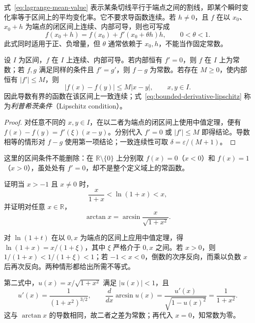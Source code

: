 \documentclass[UTF8,12pt,a4paper,fontset=fandol]{ctexbook}
\begin{document}
式~\eqref{eq:lagrange-mean-value} 表示某条切线平行于端点之间的割线，即某个瞬时变化率等于区间上的平均变化率。它不要求导函数连续。若 $h\neq0$，且 $f$ 在以 $x_0$、$x_0+h$ 为端点的闭区间上连续、内部可导，则也可写成
\begin{equation}
    f(x_0+h)=f(x_0)+f'(x_0+\theta h)h,
    \qquad 0<\theta<1.
    \label{eq:lagrange-increment-form}
\end{equation}
此式同时适用于正、负增量，但 $\theta$ 通常依赖于 $x_0,h$，不能当作固定常数。

\begin{corollary}
\label{cor:zero-derivative-and-derivative-bounds}
设 $I$ 为区间，$f$ 在 $I$ 上连续、内部可导。若内部恒有 $f'=0$，则 $f$ 在 $I$ 上为常数；若 $f,g$ 满足同样的条件且 $f'=g'$，则 $f-g$ 为常数。若存在 $M\geq0$，使内部恒有 $|f'|\leq M$，则
\begin{equation}
    |f(x)-f(y)|\leq M|x-y|,\qquad x,y\in I.
    \label{eq:bounded-derivative-lipschitz}
\end{equation}
因此导数有界的函数在该区间上一致连续；式~\eqref{eq:bounded-derivative-lipschitz} 称为\emph{利普希茨条件}（Lipschitz condition）。
\end{corollary}

\begin{proof}
对任意不同的 $x,y\in I$，在以二者为端点的闭区间上使用中值定理，便有 $f(x)-f(y)=f'(\xi)(x-y)$。分别代入 $f'=0$ 或 $|f'|\leq M$ 即得结论。导数相等的情形对 $f-g$ 使用第一项结论；一致连续性可取 $\delta=\varepsilon/(M+1)$。
\end{proof}

这里的区间条件不能删除：在 $\mathbb{R}\setminus\{0\}$ 上分别取 $f(x)=0$（$x<0$）和 $f(x)=1$（$x>0$），虽处处有 $f'=0$，却不是整个定义域上的常函数。

\begin{example}
\label{ex:mean-value-logarithm-and-identity}
证明当 $x>-1$ 且 $x\neq0$ 时，
\[
    \frac{x}{1+x}<\ln(1+x)<x,
\]
并证明对任意 $x\in\mathbb{R}$，
\[
    \arctan x=\arcsin\frac{x}{\sqrt{1+x^2}}.
\]
\end{example}

\begin{solve}
对 $\ln(1+t)$ 在以 $0,x$ 为端点的区间上应用中值定理，得 $\ln(1+x)=x/(1+\xi)$，其中 $\xi$ 严格介于 $0,x$ 之间。若 $x>0$，则 $1/(1+x)<1/(1+\xi)<1$；若 $-1<x<0$，倒数的次序反向，而乘以负数 $x$ 后再次反向。两种情形都给出所需不等式。

第二式中，$u(x)=x/\sqrt{1+x^2}$ 满足 $|u(x)|<1$，且
\[
    u'(x)=\frac1{(1+x^2)^{3/2}},\qquad
    \frac{d}{dx}\arcsin u(x)
    =\frac{u'(x)}{\sqrt{1-u(x)^2}}=\frac1{1+x^2}.
\]
这与 $\arctan x$ 的导数相同，故二者之差为常数；再代入 $x=0$，知常数为零。
\end{solve}
\end{document}
